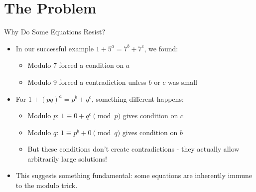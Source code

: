 \section{The Problem}

\begin{frame}{Why Do Some Equations Resist?}
    \begin{itemize}
        \item In our successful example $1+5^a = 7^b+7^c$, we found:
        \begin{itemize}
            \item Modulo 7 forced a condition on $a$
            \item Modulo 9 forced a contradiction unless $b$ or $c$ was small
        \end{itemize}

        \item For $1+(pq)^a = p^b+q^c$, something different happens:
        \begin{itemize}
            \item Modulo $p$: $1 \equiv 0 + q^c \pmod p$ gives condition on $c$
            \item Modulo $q$: $1 \equiv p^b + 0 \pmod q$ gives condition on $b$
            \item But these conditions don't create contradictions - they actually allow arbitrarily large solutions!
        \end{itemize}

        \item This suggests something fundamental: some equations are inherently immune to the modulo trick.
    \end{itemize}
\end{frame}
